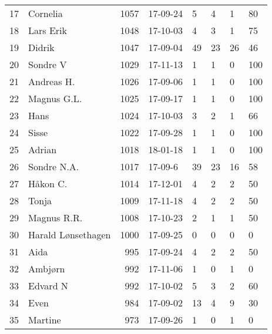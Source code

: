 \begin{longtable}{|r|l|r|l|l|l|l|l|}
17 &             Cornelia &  1057 &    17-09-24 &               5 &     4 &       1 &        80 \\
18 &            Lars Erik &  1048 &    17-10-03 &               4 &     3 &       1 &        75 \\
19 &               Didrik &  1047 &    17-09-04 &              49 &    23 &      26 &        46 \\
20 &             Sondre V &  1029 &    17-11-13 &               1 &     1 &       0 &       100 \\
21 &           Andreas H. &  1026 &    17-09-06 &               1 &     1 &       0 &       100 \\
22 &          Magnus G.L. &  1025 &    17-09-17 &               1 &     1 &       0 &       100 \\
23 &                 Hans &  1024 &    17-10-03 &               3 &     2 &       1 &        66 \\
24 &                Sisse &  1022 &    17-09-28 &               1 &     1 &       0 &       100 \\
25 &               Adrian &  1018 &    18-01-18 &               1 &     1 &       0 &       100 \\
26 &          Sondre N.A. &  1017 &     17-09-6 &              39 &    23 &      16 &        58 \\
27 &             Håkon C. &  1014 &    17-12-01 &               4 &     2 &       2 &        50 \\
28 &                Tonja &  1009 &    17-11-18 &               4 &     2 &       2 &        50 \\
29 &          Magnus R.R. &  1008 &    17-10-23 &               2 &     1 &       1 &        50 \\
30 &   Harald Lønsethagen &  1000 &    17-09-25 &               0 &     0 &       0 &         0 \\
31 &                 Aida &   995 &    17-09-24 &               4 &     2 &       2 &        50 \\
32 &              Ambjørn &   992 &    17-11-06 &               1 &     0 &       1 &         0 \\
33 &             Edvard N &   992 &    17-10-02 &               5 &     3 &       2 &        60 \\
34 &                 Even &   984 &    17-09-02 &              13 &     4 &       9 &        30 \\
35 &              Martine &   973 &    17-09-26 &               1 &     0 &       1 &         0 \\

\end{longtable}
